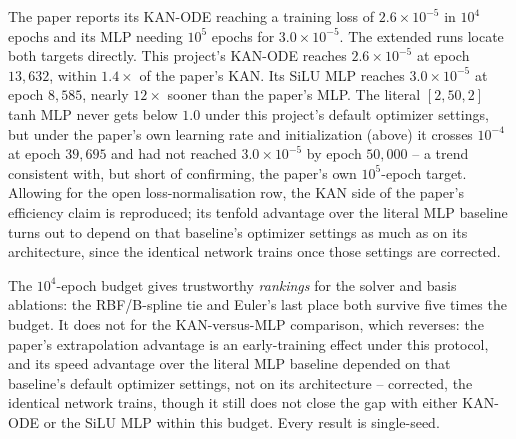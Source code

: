 The paper reports its KAN-ODE reaching a training loss of $2.6\times10^{-5}$
in $10^4$ epochs and its MLP needing $10^5$ epochs for $3.0\times10^{-5}$.
The extended runs locate both targets directly. This project's KAN-ODE
reaches $2.6\times10^{-5}$ at epoch $13{,}632$, within $1.4\times$ of the
paper's KAN. Its SiLU MLP reaches $3.0\times10^{-5}$ at epoch $8{,}585$,
nearly $12\times$ sooner than the paper's MLP. The literal $[2,50,2]$ tanh
MLP never gets below $1.0$ under this project's default optimizer settings,
but under the paper's own learning rate and initialization (above) it
crosses $10^{-4}$ at epoch $39{,}695$ and had not reached $3.0\times10^{-5}$
by epoch $50{,}000$ -- a trend consistent with, but short of confirming, the
paper's own $10^5$-epoch target. Allowing for the open loss-normalisation
row, the KAN side of the paper's efficiency claim is reproduced; its tenfold
advantage over the literal MLP baseline turns out to depend on that
baseline's optimizer settings as much as on its architecture, since the
identical network trains once those settings are corrected.

\begin{keypoint}
The $10^4$-epoch budget gives trustworthy \emph{rankings} for the solver and
basis ablations: the RBF/B-spline tie and Euler's last place both survive
five times the budget. It does not for the KAN-versus-MLP comparison, which
reverses: the paper's extrapolation advantage is an early-training effect
under this protocol, and its speed advantage over the literal MLP baseline
depended on that baseline's default optimizer settings, not on its
architecture -- corrected, the identical network trains, though it still
does not close the gap with either KAN-ODE or the SiLU MLP within this
budget. Every result is single-seed.
\end{keypoint}

\FloatBarrier
